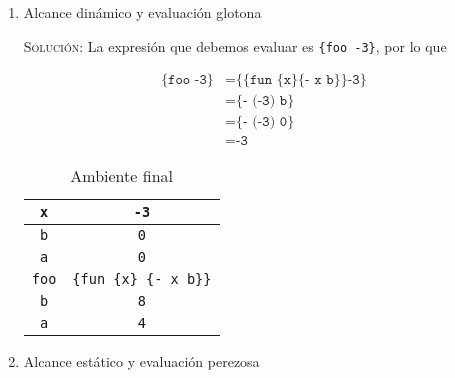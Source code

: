\documentclass[letterpaper,11pt]{article}
\begin{document}
\begin{enumerate}
\begin{enumerate}
        \item Alcance dinámico y evaluación glotona 

        \textsc{Solución:} La expresión que debemos evaluar es 
        \texttt{\{foo -3\}}, por lo que 
        \begin{table}[h]
            \parbox{.55\linewidth}{
            \centering
            \begin{align*}
                \texttt{\{foo -3\}}
                &= \texttt{\{\{fun \{x\} \{- x b\}\} -3\}} \\
                &= \texttt{\{- (-3) b\}} \\
                &= \texttt{\{- (-3) 0\}} \\ 
                &= \texttt{-3}
            \end{align*}
            }
            \hfill
            \parbox{.45\linewidth}{
            \centering
            \begin{tabular}{|c|c|}
                \hline
                \texttt{x} & \texttt{-3} \\
                \hline
                \texttt{b} & \texttt{0} \\
                \hline
                \texttt{a} & \texttt{0} \\
                \hline
                \texttt{foo} & \texttt{\{fun \{x\} \{- x b\}\}} \\
                \hline
                \texttt{b} & \texttt{8} \\
                \hline
                \texttt{a} & \texttt{4} \\
                \hline
            \end{tabular}
            \caption{Ambiente final}
            }
        \end{table}

        \newpage
        \item Alcance estático y evaluación perezosa


\end{enumerate}
\end{enumerate}
\end{document}
